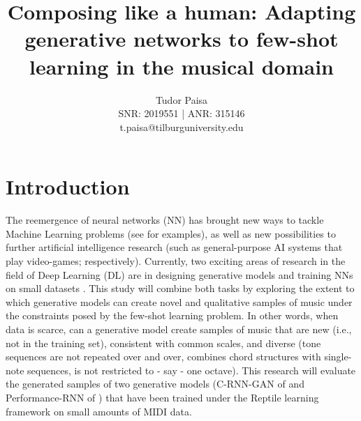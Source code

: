 \documentclass[11pt, a4paper, man, floatsintext]{apa6}
\title{Composing like a human: Adapting generative networks to few-shot learning in the musical domain}
\author{Tudor Paisa\\
        SNR: 2019551 | ANR: 315146\\
        t.paisa@tilburguniversity.edu
    }
\affiliation{Tilburg University\\
        School of Humanities and Digital Sciences\\
        Department of Cognitive Science \& Artificial Intelligence\\
        Tilburg, The Netherlands}
\begin{document}
\maketitle

\section{Introduction}

The reemergence of neural networks (NN) has brought new ways to tackle Machine Learning problems (see \cite{lecun_deep_2015} for examples), as well as new possibilities to further artificial intelligence research (such as general-purpose AI systems that play video-games; \cite{vinyals_starcraft_2017} respectively). Currently, two exciting areas of research in the field of Deep Learning (DL) are in designing generative models \parencite{goodfellow_nips_2016} and training NNs on small datasets \parencite{finn_model-agnostic_2017, nichol_first-order_2018}. This study will combine both tasks by exploring the extent to which generative models can create novel and qualitative samples of music under the constraints posed by the few-shot learning problem. In other words, when data is scarce, can a generative model create samples of music that are new (i.e., not in the training set), consistent with common scales, and diverse (tone sequences are not repeated over and over, combines chord structures with single-note sequences, is not restricted to - say - one octave). This research will evaluate the generated samples of two generative models (C-RNN-GAN of \cite{mogren_c-rnn-gan_2016} and Performance-RNN of \cite{oore_this_2018}) that have been trained under the Reptile learning framework \parencite{nichol_first-order_2018} on small amounts of MIDI data.
\end{document}
